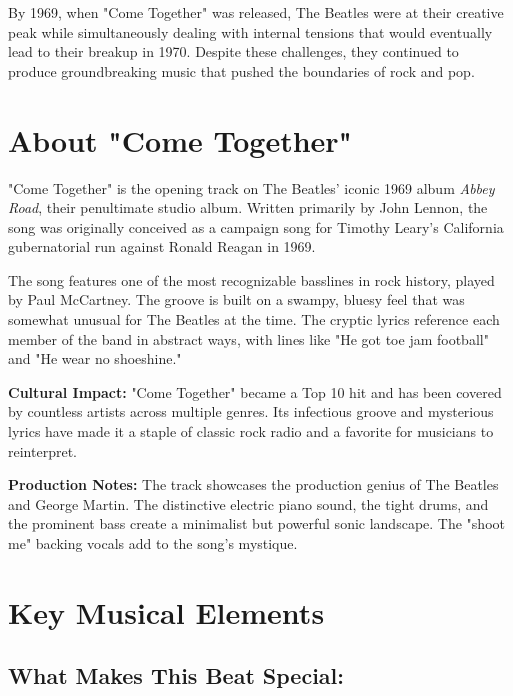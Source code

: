 \documentclass[11pt,letterpaper]{article}
\begin{document}
By 1969, when "Come Together" was released, The Beatles were at their creative peak while simultaneously dealing with internal tensions that would eventually lead to their breakup in 1970. Despite these challenges, they continued to produce groundbreaking music that pushed the boundaries of rock and pop.

\vspace{0.5cm}

\section*{About "Come Together"}

"Come Together" is the opening track on The Beatles' iconic 1969 album \textit{Abbey Road}, their penultimate studio album. Written primarily by John Lennon, the song was originally conceived as a campaign song for Timothy Leary's California gubernatorial run against Ronald Reagan in 1969.

The song features one of the most recognizable basslines in rock history, played by Paul McCartney. The groove is built on a swampy, bluesy feel that was somewhat unusual for The Beatles at the time. The cryptic lyrics reference each member of the band in abstract ways, with lines like "He got toe jam football" and "He wear no shoeshine."

\textbf{Cultural Impact:} "Come Together" became a Top 10 hit and has been covered by countless artists across multiple genres. Its infectious groove and mysterious lyrics have made it a staple of classic rock radio and a favorite for musicians to reinterpret.

\textbf{Production Notes:} The track showcases the production genius of The Beatles and George Martin. The distinctive electric piano sound, the tight drums, and the prominent bass create a minimalist but powerful sonic landscape. The "shoot me" backing vocals add to the song's mystique.

\vspace{0.5cm}

\section*{Key Musical Elements}

\subsection*{What Makes This Beat Special:}
\end{document}
